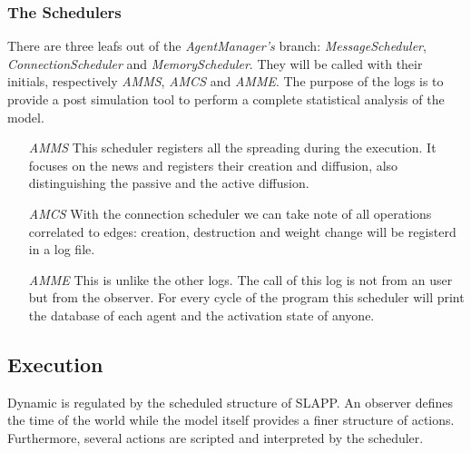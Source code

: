 \subsubsection{The Schedulers}
There are three leafs out of the \textit{AgentManager's} branch:
\textit{MessageScheduler}, \textit{ConnectionScheduler} and
\textit{MemoryScheduler}. They will be called with their initials,
respectively \textit{AMMS}, \textit{AMCS} and \textit{AMME}.
The purpose of the logs is to provide a post simulation tool to perform
a complete statistical analysis of the model. 
\begin{itemize}
\item[\textit{AMMS}] This scheduler registers all the spreading during the
  execution. It focuses on the news and registers their creation and
  diffusion, also distinguishing the passive and the active diffusion.
\item[\textit{AMCS}] With the connection scheduler we can take note of
  all operations correlated to edges: creation, destruction and weight
  change will be registerd in a log file.
\item[\textit{AMME}] This is unlike the other logs. The call of this log is
  not from an user but from the observer. For every cycle of the program
  this scheduler will print the database of each agent and the activation
  state of anyone.
\end{itemize}

\subsection{Execution}
Dynamic is regulated by the scheduled structure of SLAPP. An observer defines
the time of the world while the model itself provides a finer structure of
actions. Furthermore, several actions are scripted and interpreted by
the scheduler.

